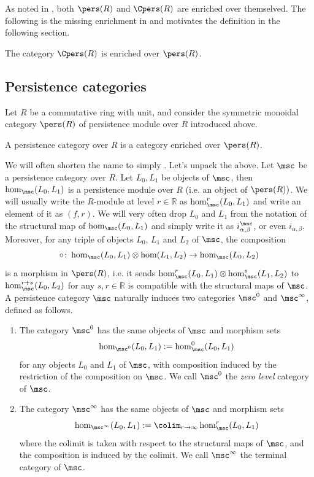 As noted in \cite{bubenik2021}, both $\pers(R)$ and $\Cpers(R)$ are enriched over themselved. The following is the missing enrichment in \cite{bubenik2021} and motivates the definition in the following section.
\begin{lem}\label{taut}
    The category $\Cpers(R)$ is enriched over $\pers(R)$.
\end{lem}




\subsection{Persistence categories}\label{se:pc}
Let $R$ be a commutative ring with unit, and consider the symmetric monoidal category $\pers(R)$ of persistence module over $R$ introduced above.
\begin{dfn}
    A persistence category over $R$ is a category enriched over $\pers(R)$.
\end{dfn}
We will often shorten the name  to simply . Let's unpack the above. Let $\msc$ be a persistence category over $R$. Let $L_0,L_1$ be objects of $\msc$, then $\hom_\msc(L_0,L_1)$ is a persistence module over $R$ (i.e. an object of $\pers(R))$. We will usually write the $R$-module at level $r\in \mathbb{R}$ as $\hom^r_\msc(L_0,L_1)$ and write an element of it as $(f,r)$. We will very often drop $L_0$ and $L_1$ from the notation of the structural map of $\hom_\msc(L_0,L_1)$ and simply write it as $i^\msc_{\alpha,\beta}$, or even $i_{\alpha,\beta}$. Moreover, for any triple of objects $L_0$, $L_1$ and $L_2$ of $\msc$, the composition $$\circ \colon \hom_\msc(L_0,L_1)\otimes \hom(L_1,L_2)\to \hom_\msc(L_0,L_2)$$ is a morphism in $\pers(R)$, i.e. it sends $\hom^r_\msc(L_0,L_1)\otimes \hom^s_\msc(L_1,L_2)$ to $\hom_\msc^{r+s}(L_0,L_2)$ for any $s,r\in \mathbb{R}$ is compatible with the structural maps of $\msc$.\\

A persistence category $\msc$ naturally induces two categories $\msc^0$ and $\msc^\infty$, defined as follows.
\begin{enumerate}
    \item[0] The category $\msc^0$ has the same objects of $\msc$ and morphism sets $$\hom_{\msc^0}(L_0,L_1):= \hom_\msc^0(L_0,L_1)$$ for any objects $L_0$ and $L_1$ of $\msc$, with composition induced by the restriction of the composition on $\msc$. We call $\msc^0$ the \textit{zero level} category of $\msc$.
    \item[$\infty$] The category $\msc^\infty$ has the same objects of $\msc$ and morphism sets $$\hom_{\msc^\infty}(L_0,L_1):= \colim_{r\to \infty}\hom_\msc^r(L_0,L_1)$$ where the colimit is taken with respect to the structural maps of $\msc$, and the composition is induced by the colimit. We call $\msc^\infty$ the terminal category of $\msc$.
\end{enumerate}

